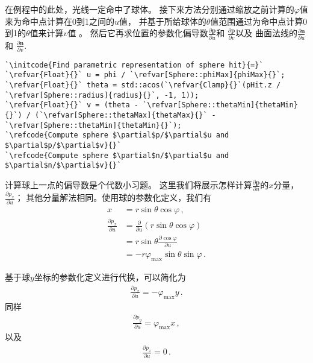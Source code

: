 在例程中的此处，光线一定命中了球体。
接下来方法分别通过缩放之前计算的$\varphi$值来为命中点计算在0到1之间的$u$值，
并基于所给球体的$\theta$值范围通过为命中点计算0到1的$\theta$值来计算$v$值
。
然后它再求位置的参数化偏导数$\displaystyle\frac{\partial \bm p}{\partial u}$和
$\displaystyle\frac{\partial \bm p}{\partial v}$以及
曲面法线的$\displaystyle\frac{\partial \bm n}{\partial u}$和
$\displaystyle\frac{\partial \bm n}{\partial v}$.
\begin{lstlisting}
`\initcode{Find parametric representation of sphere hit}{=}`
`\refvar{Float}{}` u = phi / `\refvar[Sphere::phiMax]{phiMax}{}`;
`\refvar{Float}{}` theta = std::acos(`\refvar{Clamp}{}`(pHit.z / `\refvar[Sphere::radius]{radius}{}`, -1, 1));
`\refvar{Float}{}` v = (theta - `\refvar[Sphere::thetaMin]{thetaMin}{}`) / (`\refvar[Sphere::thetaMax]{thetaMax}{}` - `\refvar[Sphere::thetaMin]{thetaMin}{}`);
`\refcode{Compute sphere $\partial$p/$\partial$u and $\partial$p/$\partial$v}{}`
`\refcode{Compute sphere $\partial$n/$\partial$u and $\partial$n/$\partial$v}{}`
\end{lstlisting}

计算球上一点的偏导数是个代数小习题。
这里我们将展示怎样计算$\displaystyle\frac{\partial \bm p}{\partial u}$的$x$分量，
$\displaystyle\frac{\partial p_x}{\partial u}$；
其他分量解法相同。使用球的参数化定义，我们有
\begin{align*}
    x                               & =r\sin\theta\cos\varphi\, ,                          \\
    \frac{\partial p_x}{\partial u} & =\frac{\partial}{\partial u}(r\sin\theta\cos\varphi) \\
                                    & =r\sin\theta\frac{\partial\cos\varphi}{\partial u}   \\
                                    & =-r\varphi_{\max}\sin\theta\sin\varphi\, .
\end{align*}

基于球$y$坐标的参数化定义进行代换，可以简化为
\begin{align*}
    \frac{\partial p_x}{\partial u}=-\varphi_{\max}y\, .
\end{align*}
同样
\begin{align*}
    \frac{\partial p_y}{\partial u}=\varphi_{\max}x\, ,
\end{align*}
以及
\begin{align*}
    \frac{\partial p_z}{\partial u}=0\, .
\end{align*}

